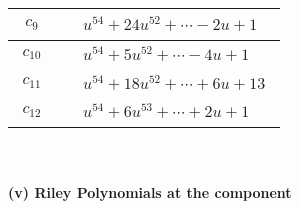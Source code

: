 \documentclass[1p]{elsarticle_modified}
\theoremstyle{definition}
\begin{document}
\begin{tabular}{m{50pt}|m{274pt}}
\hline $$\begin{aligned}c_{9}\end{aligned}$$&$\begin{aligned}
&u^{54}+24 u^{52}+\cdots-2 u+1
\end{aligned}$\\
\hline $$\begin{aligned}c_{10}\end{aligned}$$&$\begin{aligned}
&u^{54}+5 u^{52}+\cdots-4 u+1
\end{aligned}$\\
\hline $$\begin{aligned}c_{11}\end{aligned}$$&$\begin{aligned}
&u^{54}+18 u^{52}+\cdots+6 u+13
\end{aligned}$\\
\hline $$\begin{aligned}c_{12}\end{aligned}$$&$\begin{aligned}
&u^{54}+6 u^{53}+\cdots+2 u+1
\end{aligned}$\\
\hline
\end{tabular}\\~\\
\newpage\renewcommand{\arraystretch}{1}
\flushleft \textbf{(v) Riley Polynomials at the component}\newline \\
\end{document}
